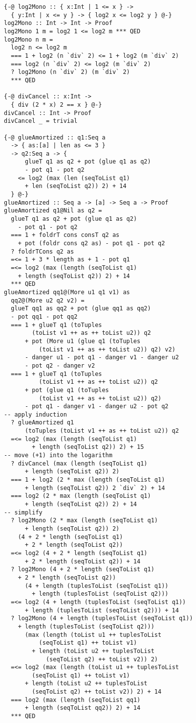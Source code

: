 \documentclass[sigplan,screen,review,anonymous]{acmart}
\begin{document}
\begin{lstlisting}
{-@ log2Mono :: { x:Int | 1 <= x } ->
  { y:Int | x <= y } -> { log2 x <= log2 y } @-}
log2Mono :: Int -> Int -> Proof
log2Mono 1 m = log2 1 <= log2 m *** QED
log2Mono n m =
  log2 n <= log2 m
  === 1 + log2 (n `div` 2) <= 1 + log2 (m `div` 2)
  === log2 (n `div` 2) <= log2 (m `div` 2)
  ? log2Mono (n `div` 2) (m `div` 2)
  *** QED

{-@ divCancel :: x:Int ->
  { div (2 * x) 2 == x } @-}
divCancel :: Int -> Proof
divCancel _ = trivial

{-@ glueAmortized :: q1:Seq a
  -> { as:[a] | len as <= 3 }
  -> q2:Seq a -> {
      glueT q1 as q2 + pot (glue q1 as q2)
      - pot q1 - pot q2
    <= log2 (max (len (seqToList q1)
      + len (seqToList q2)) 2) + 14
  } @-}
glueAmortized :: Seq a -> [a] -> Seq a -> Proof
glueAmortized q1@Nil as q2 =
  glueT q1 as q2 + pot (glue q1 as q2)
    - pot q1 - pot q2
  === 1 + foldrT cons consT q2 as
    + pot (foldr cons q2 as) - pot q1 - pot q2
  ? foldrTCons q2 as
  =<= 1 + 3 * length as + 1 - pot q1
  =<= log2 (max (length (seqToList q1)
    + length (seqToList q2)) 2) + 14
  *** QED
glueAmortized qq1@(More u1 q1 v1) as
  qq2@(More u2 q2 v2) =
  glueT qq1 as qq2 + pot (glue qq1 as qq2)
  - pot qq1 - pot qq2
  === 1 + glueT q1 (toTuples
        (toList v1 ++ as ++ toList u2)) q2
      + pot (More u1 (glue q1 (toTuples
          (toList v1 ++ as ++ toList u2)) q2) v2)
      - danger u1 - pot q1 - danger v1 - danger u2
      - pot q2 - danger v2
  === 1 + glueT q1 (toTuples
          (toList v1 ++ as ++ toList u2)) q2
      + pot (glue q1 (toTuples
          (toList v1 ++ as ++ toList u2)) q2)
      - pot q1 - danger v1 - danger u2 - pot q2
-- apply induction
  ? glueAmortized q1
      (toTuples (toList v1 ++ as ++ toList u2)) q2
  =<= log2 (max (length (seqToList q1)
        + length (seqToList q2)) 2) + 15
-- move (+1) into the logarithm
  ? divCancel (max (length (seqToList q1)
      + length (seqToList q2)) 2)
  === 1 + log2 (2 * max (length (seqToList q1)
      + length (seqToList q2)) 2 `div` 2) + 14
  === log2 (2 * max (length (seqToList q1)
      + length (seqToList q2)) 2) + 14
-- simplify
  ? log2Mono (2 * max (length (seqToList q1)
      + length (seqToList q2)) 2)
    (4 + 2 * length (seqToList q1)
      + 2 * length (seqToList q2))
  =<= log2 (4 + 2 * length (seqToList q1)
      + 2 * length (seqToList q2)) + 14
  ? log2Mono (4 + 2 * length (seqToList q1)
    + 2 * length (seqToList q2))
      (4 + length (tuplesToList (seqToList q1))
        + length (tuplesToList (seqToList q2)))
  =<= log2 (4 + length (tuplesToList (seqToList q1))
      + length (tuplesToList (seqToList q2))) + 14
  ? log2Mono (4 + length (tuplesToList (seqToList q1))
    + length (tuplesToList (seqToList q2))) 
      (max (length (toList u1 ++ tuplesToList
          (seqToList q1) ++ toList v1)
        + length (toList u2 ++ tuplesToList
            (seqToList q2) ++ toList v2)) 2)
  =<= log2 (max (length (toList u1 ++ tuplesToList
        (seqToList q1) ++ toList v1)
      + length (toList u2 ++ tuplesToList
        (seqToList q2) ++ toList v2)) 2) + 14
  === log2 (max (length (seqToList qq1)
      + length (seqToList qq2)) 2) + 14
  *** QED
\end{lstlisting}
\end{document}
